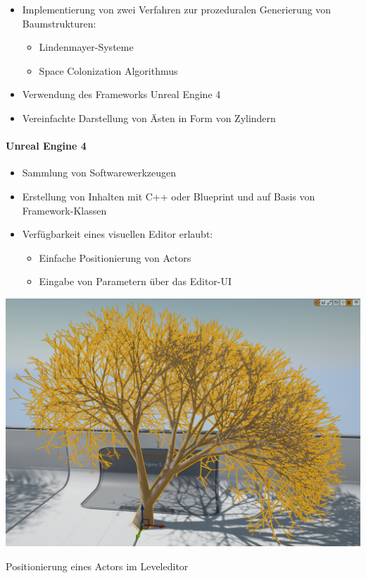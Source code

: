 \begin{itemize}
	\item Implementierung von zwei Verfahren zur prozeduralen Generierung von Baumstrukturen:
	\begin{itemize}
		\item Lindenmayer-Systeme
		\item Space Colonization Algorithmus\\
	\end{itemize}
	\item Verwendung des Frameworks \glqq Unreal Engine 4\grqq\\
	
	\item Vereinfachte Darstellung von Ästen in Form von Zylindern
\end{itemize}

\newpage
{}
\paragraph{Unreal Engine 4\\}

\begin{itemize}
	\item Sammlung von Softwarewerkzeugen \\
	
	\item Erstellung von Inhalten mit C++ oder Blueprint und auf Basis von Framework-Klassen\\
	
	\item Verfügbarkeit eines visuellen Editor erlaubt:
	\begin{itemize}
		\item Einfache Positionierung von Actors
		\item Eingabe von Parametern über das Editor-UI
	\end{itemize}
\end{itemize}

\newpage
\begin{center}
	\includegraphics[height=0.9\textheight]{images/CH1_EditorExample1.png}
	
	Positionierung eines Actors im Leveleditor
\end{center}

